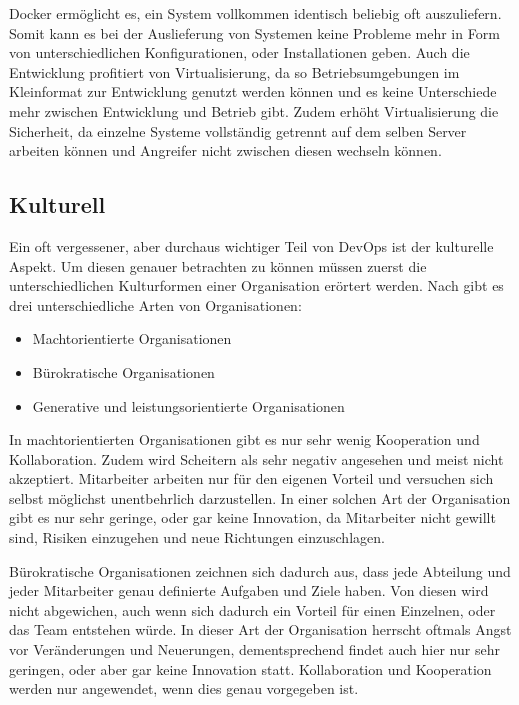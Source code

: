 Docker ermöglicht es, ein System vollkommen identisch beliebig oft auszuliefern. 
Somit kann es bei der Auslieferung von Systemen keine Probleme mehr in Form von unterschiedlichen Konfigurationen, oder Installationen geben. 
Auch die Entwicklung profitiert von Virtualisierung, da so Betriebsumgebungen im Kleinformat zur Entwicklung genutzt werden können und es keine Unterschiede mehr zwischen Entwicklung und Betrieb gibt.
Zudem erhöht Virtualisierung die Sicherheit, da einzelne Systeme vollständig getrennt auf dem selben Server arbeiten können und Angreifer nicht zwischen diesen wechseln können. 
\parencite[Vgl.][S. 1 - 22]{matthias:2015}

\subsection{Kulturell}
Ein oft vergessener, aber durchaus wichtiger Teil von DevOps ist der kulturelle Aspekt. 
Um diesen genauer betrachten zu können müssen zuerst die unterschiedlichen Kulturformen einer Organisation erörtert werden.
Nach \parencite[vgl.][S. 2]{westrum:2004} gibt es drei unterschiedliche Arten von Organisationen:

\begin{itemize}
\item Machtorientierte Organisationen
\item Bürokratische Organisationen
\item Generative und leistungsorientierte Organisationen
\end{itemize}

In machtorientierten Organisationen gibt es nur sehr wenig Kooperation und Kollaboration.
Zudem wird Scheitern als sehr negativ angesehen und meist nicht akzeptiert. Mitarbeiter arbeiten nur für den eigenen Vorteil und versuchen sich selbst möglichst unentbehrlich darzustellen. 
In einer solchen Art der Organisation gibt es nur sehr geringe, oder gar keine Innovation, da Mitarbeiter nicht gewillt sind, Risiken einzugehen und neue Richtungen einzuschlagen. \parencite[vgl.][S. 2]{westrum:2004}

Bürokratische Organisationen zeichnen sich dadurch aus, dass jede Abteilung und jeder Mitarbeiter genau definierte Aufgaben und Ziele haben. 
Von diesen wird nicht abgewichen, auch wenn sich dadurch ein Vorteil für einen Einzelnen, oder das Team entstehen würde. 
In dieser Art der Organisation herrscht oftmals Angst vor Veränderungen und Neuerungen, dementsprechend findet auch hier nur sehr geringen, oder aber gar keine Innovation statt. Kollaboration und Kooperation werden nur angewendet, wenn dies genau vorgegeben ist. \parencite[vgl.][S. 2]{westrum:2004}

